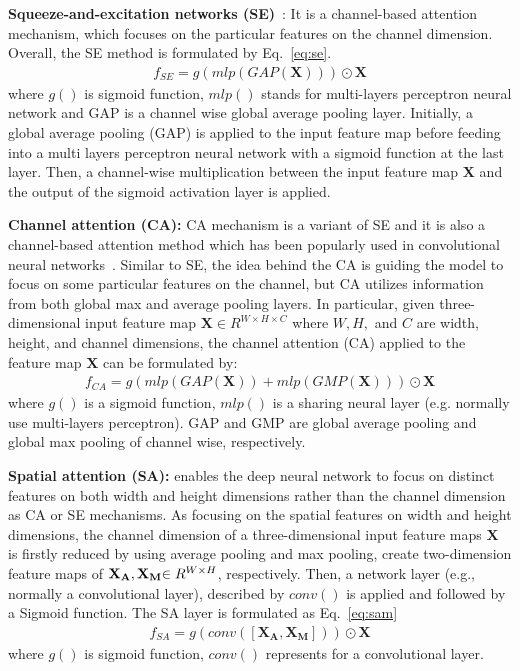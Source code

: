 \documentclass[sigconf]{acmart}
\begin{document}
\textbf{Squeeze-and-excitation networks (SE)}~\cite{hu2018squeeze}: It is a channel-based attention mechanism, which focuses on the particular features on the channel dimension. 
Overall, the SE method is formulated by Eq.~\ref{eq:se}.
\begin{align}
   \label{eq:se}
   f_{SE} = g(mlp(GAP(\mathbf{X}))) \odot \mathbf{X}
\end{align}
where ${g()}$ is sigmoid function, $mlp()$ stands for multi-layers perceptron neural network and GAP is a channel wise global average pooling layer.
Initially, a global average pooling (GAP) is applied to the input feature map before feeding into a multi layers perceptron neural network with a sigmoid function at the last layer. 
Then, a channel-wise multiplication between the input feature map $\mathbf{X}$ and the output of the sigmoid activation layer is applied.

\textbf{Channel attention (CA):} CA mechanism is a variant of SE and it is also a channel-based attention method which has been popularly used in convolutional neural networks~\cite{guo2019global, Zhao_2022}. 
Similar to SE, the idea behind the CA is guiding the model to focus on some particular features on the channel, but CA utilizes information from both global max and average pooling layers.
In particular, given three-dimensional input feature map $\mathbf{X}\in R^{W\times H\times C}$ where $W, H,$ and $C$ are width, height, and channel dimensions, the channel attention (CA) applied to the feature map $\mathbf{X}$ can be formulated by:
\begin{align}
   \label{eq:ca}
   f_{CA} = g(mlp(GAP(\mathbf{X})) +  mlp(GMP(\mathbf{X})))  \odot \mathbf{X}
\end{align}
where ${g()}$ is a sigmoid function, $mlp()$ is a sharing neural layer (e.g. normally use multi-layers perceptron). 
GAP and GMP are global average pooling and global max pooling of channel wise, respectively.

\textbf{Spatial attention (SA):} enables the deep neural network to focus on distinct features on both width and height dimensions rather than the channel dimension as CA or SE mechanisms.
As focusing on the spatial features on width and height dimensions, the channel dimension of a three-dimensional input feature maps $\mathbf{X}$ is firstly reduced by using average pooling and max pooling, create two-dimension feature maps of $\mathbf{X_{A}, X_{M}}{\mathnormal{\in R^{W\times H}}}$, respectively.
Then, a network layer (e.g., normally a convolutional layer), described by $conv()$ is applied and followed by a Sigmoid function.
The SA layer is formulated as Eq.~\ref{eq:sam}
\begin{align}
   \label{eq:sam}
   f_{SA} = g(conv( [\mathbf{X_{A}}, \mathbf{X_{M}}] ) ) \odot \mathbf{X}
\end{align}
where $g()$ is sigmoid function, $conv()$ represents for a convolutional layer.
 
\end{document}

